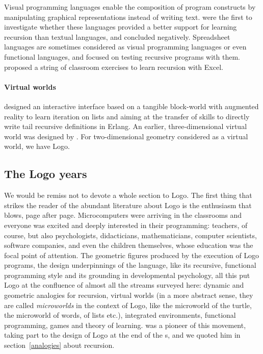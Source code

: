 \documentclass[11pt,a4paper]{article}
\newcommand\plang[1]{\textsf{#1}\xspace}
\begin{document}
Visual programming languages enable the composition of program
constructs by manipulating graphical representations instead of
writing text. \textcite{GoodBrna:1996} were the first to investigate
whether these languages provided a better support for learning
recursion than textual languages, and concluded negatively.
Spreadsheet languages are sometimes considered as visual programming
languages or even functional languages, and
\textcite{BurnettRenKoCookRothermel:2001} focused on testing recursive
programs with them. \textcite{Kim:2003} proposed a string of classroom
exercises to learn recursion with \plang{Excel}.

\paragraph{Virtual worlds}

\textcite{TasconRinderknechtKimKim:2010} designed an interactive
interface based on a tangible block\hyp{}world with augmented reality
to learn iteration on lists and aiming at the transfer of skills to
directly write tail recursive definitions in \plang{Erlang}. An
earlier, three\hyp{}dimensional virtual world was designed by
\textcite{DannCooperPausch:2001}. For two\hyp{}dimensional geometry
considered as a virtual world, we have \plang{Logo}.

\subsection{The \plang{Logo} years}
\label{logo}

We would be remiss not to devote a whole section to \plang{Logo}. The
first thing that strikes the reader of the abundant literature about
\plang{Logo} is the enthusiasm that blows, page after page.
Microcomputers were arriving in the classrooms and everyone was
excited and deeply interested in their programming: teachers, of
course, but also psychologists, didacticians, mathematicians, computer
scientists, software companies, and even the children themselves,
whose education was the focal point of attention. The geometric
figures produced by the execution of \plang{Logo} programs, the design
underpinnings of the language, like its recursive, functional
programming style and its grounding in developmental psychology, all
this put \plang{Logo} at the confluence of almost all the streams
surveyed here: dynamic and geometric analogies for recursion, virtual
worlds (in a more abstract sense, they are called \emph{microworlds}
in the context of \plang{Logo}, like the microworld of the turtle, the
microworld of words, of lists etc.\@), integrated environments,
functional programming, games and theory of learning.
\textcite{Papert:1980} was a pioneer of this movement, taking part to
the design of \plang{Logo} at the end of the s, and
we quoted him in section~\ref{analogies} about recursion.
\end{document}
